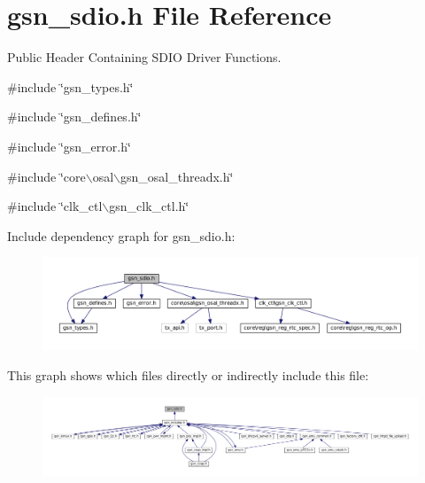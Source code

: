 \hypertarget{a00584}{
\section{gsn\_\-sdio.h File Reference}
\label{a00584}
}


Public Header Containing SDIO Driver Functions.  


{\ttfamily \#include \char`\"{}gsn\_\-types.h\char`\"{}}\par
{\ttfamily \#include \char`\"{}gsn\_\-defines.h\char`\"{}}\par
{\ttfamily \#include \char`\"{}gsn\_\-error.h\char`\"{}}\par
{\ttfamily \#include \char`\"{}core$\backslash$osal$\backslash$gsn\_\-osal\_\-threadx.h\char`\"{}}\par
{\ttfamily \#include \char`\"{}clk\_\-ctl$\backslash$gsn\_\-clk\_\-ctl.h\char`\"{}}\par
Include dependency graph for gsn\_\-sdio.h:
\nopagebreak
\begin{figure}[H]
\begin{center}
\leavevmode
\includegraphics[width=400pt]{a00821}
\end{center}
\end{figure}
This graph shows which files directly or indirectly include this file:
\nopagebreak
\begin{figure}[H]
\begin{center}
\leavevmode
\includegraphics[width=400pt]{a00822}
\end{center}
\end{figure}
